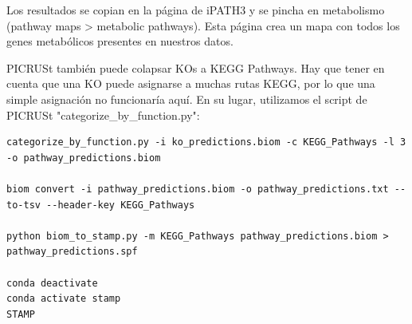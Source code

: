Los resultados se copian en la página de iPATH3 y se pincha en metabolismo (pathway maps > metabolic pathways). Esta página crea un mapa con todos los genes metabólicos presentes en nuestros datos. 

PICRUSt también puede colapsar KOs a KEGG Pathways. Hay que tener en cuenta que una KO puede asignarse a muchas rutas KEGG, por lo que una simple asignación no funcionaría aquí. En su lugar, utilizamos el script de PICRUSt "categorize\_by\_function.py":
\begin{lstlisting}
categorize_by_function.py -i ko_predictions.biom -c KEGG_Pathways -l 3 -o pathway_predictions.biom

biom convert -i pathway_predictions.biom -o pathway_predictions.txt --to-tsv --header-key KEGG_Pathways

python biom_to_stamp.py -m KEGG_Pathways pathway_predictions.biom > pathway_predictions.spf

conda deactivate
conda activate stamp
STAMP
\end{lstlisting}